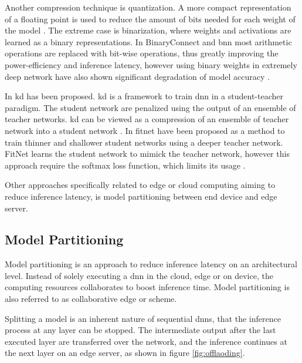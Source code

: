 Another compression technique is quantization. A more compact representation of a floating point is used to reduce the amount of bits needed for each weight of the model \cite{cheng_survey_2017}. The extreme case is binarization, where weights and activations are learned as a binary representations. In BinaryConnect \cite{courbariaux_binaryconnect:_2015} and \gls{bnn} \cite{courbariaux_binarized_2016} most arithmetic operations are replaced with bit-wise operations, thus greatly improving the power-efficiency and inference latency, however using binary weights in extremely deep network have also shown significant degradation of model accuracy \cite{cheng_survey_2017}.

In \cite{hinton_distilling_2015} \gls{kd} has been proposed. \gls{kd} is a framework to train \gls{dnn} in a student-teacher paradigm. The student network are penalized using the output of an ensemble of teacher networks. \gls{kd} can be viewed as a compression of an ensemble of teacher network into a student network \cite{cheng_survey_2017}. 
In \cite{romero_fitnets:_2014} \gls{fitnet} have been proposed as a method to train thinner and shallower student networks using a deeper teacher network. FitNet learns the student network to mimick the teacher network, however this approach require the softmax loss function, which limits its usage \cite{cheng_survey_2017}.  

Other approaches specifically related to edge or cloud computing aiming to reduce inference latency, is model partitioning between end device and edge server. 

\subsection{Model Partitioning}

Model partitioning is an approach to reduce inference latency on an architectural level. Instead of solely executing a \gls{dnn} in the cloud, edge or on device, the computing resources collaborates to boost inference time. Model partitioning is also referred to as collaborative edge or scheme.

Splitting a model is an inherent nature of sequential \gls{dnn}s, that the inference process at any layer can be stopped. The intermediate output after the last executed layer are transferred over the network, and the inference continues at the next layer on an edge server, as shown in figure \ref{fig:offlaoding}.

